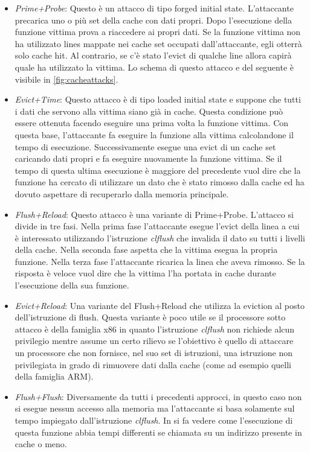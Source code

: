 			\begin{itemize}
				\item \emph{Prime+Probe}\cite{osvik2006cache}: Questo è un attacco di tipo forged initial state. L'attaccante precarica uno o più set della cache con dati propri. Dopo l'esecuzione della funzione vittima prova a riaccedere ai propri dati. Se la funzione vittima non ha utilizzato lines mappate nei cache set occupati dall'attaccante, egli otterrà solo cache hit. Al contrario, se c'è stato l'evict di qualche line allora capirà quale ha utilizzato la vittima. Lo schema di questo attacco e del seguente è visibile in \cref{fig:cacheattacks}.
				\item \emph{Evict+Time}\cite{osvik2006cache}: Questo attacco è di tipo loaded initial state e suppone che tutti i dati che servono alla vittima siano già in cache. Questa condizione può essere ottenuta facendo eseguire una prima volta la funzione vittima. Con questa base, l'attaccante fa eseguire la funzione alla vittima calcolandone il tempo di esecuzione. Successivamente esegue una evict di un cache set caricando dati propri e fa eseguire nuovamente la funzione vittima. Se il tempo di questa ultima esecuzione è maggiore del precedente vuol dire che la funzione ha cercato di utilizzare un dato che è stato rimosso dalla cache ed ha dovuto aspettare di recuperarlo dalla memoria principale.
				\item \emph{Flush+Reload}\cite{yarom2014flush+}: Questo attacco è una variante di Prime+Probe. L'attacco si divide in tre fasi. Nella prima fase l'attaccante esegue l'evict della linea a cui è interessato utilizzando l'istruzione \emph{clflush}\cite{intel64and} che invalida il dato su tutti i livelli della cache. Nella seconda fase aspetta che la vittima esegua la propria funzione. Nella terza fase l'attaccante ricarica la linea che aveva rimosso. Se la risposta è veloce vuol dire che la vittima l'ha portata in cache durante l'esecuzione della sua funzione.
				\item \emph{Evict+Reload}\cite{gruss2015cache}: Una variante del Flush+Reload che utilizza la eviction al posto dell'istruzione di flush. Questa variante è poco utile se il processore sotto attacco è della famiglia x86 in quanto l'istruzione \emph{clflush} non richiede alcun privilegio mentre assume un certo rilievo se l'obiettivo è quello di attaccare un processore che non fornisce, nel suo set di istruzioni, una istruzione non privilegiata in grado di rimuovere dati dalla cache (come ad esempio quelli della famiglia ARM).
				\item \emph{Flush+Flush}\cite{gruss2016flush+}: Diversamente da tutti i precedenti approcci, in questo caso non si esegue nessun accesso alla memoria ma l'attaccante si basa solamente sul tempo impiegato dall'istruzione \emph{clflush}. In \cite{lipp2016armageddon} si fa vedere come l'esecuzione di questa funzione abbia tempi differenti se chiamata su un indirizzo presente in cache o meno.  
			\end{itemize}
		
